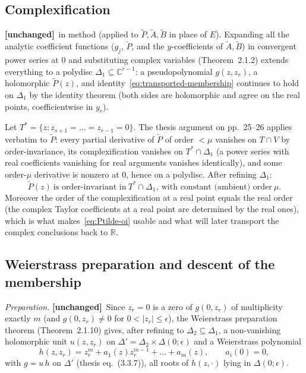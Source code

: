 \documentclass[11pt,a4paper]{article}
\theoremstyle{plain}
\theoremstyle{definition}
\newcommand{\R}{\mathbb{R}}
\newcommand{\C}{\mathbb{C}}
\newcommand{\UNCHANGED}{\textbf{[unchanged]}}
\begin{document}
\subsection{Complexification}\label{ssec:complexify}

\UNCHANGED\ in method (applied to $\widetilde P,\widetilde A,\widetilde B$ in
place of $E$). Expanding all the analytic coefficient functions
($g_j$, $\widetilde P$, and the $y$-coefficients of $\widetilde A,\widetilde
B$) in convergent power series at $0$ and substituting complex variables
(Theorem~2.1.2) extends everything to a polydisc
$\Delta_1\subseteq\C^{r-1}$: a pseudopolynomial $g(z,z_r)$, a holomorphic
$\widetilde P(z)$, and identity~\eqref{eq:transported-membership} continues to
hold on $\Delta_1$ by the identity theorem (both sides are holomorphic and
agree on the real points, coefficientwise in $y_r$).

Let $T^*=\{z:z_{s+1}=\dots=z_{r-1}=0\}$. The thesis argument on pp.~25--26
applies verbatim to $\widetilde P$: every partial derivative of
$\widetilde P$ of order $<\mu$ vanishes on $T\cap V$ by order-invariance, its
complexification vanishes on $T^*\cap\Delta_1$ (a power series with real
coefficients vanishing for real arguments vanishes identically), and some
order-$\mu$ derivative is nonzero at $0$, hence on a polydisc. After
refining $\Delta_1$:
\begin{equation}\label{eq:Ptilde-oi}
  \widetilde P(z)\ \text{is order-invariant in}\ T^*\cap\Delta_1,
  \ \text{with constant (ambient) order}\ \mu .
\end{equation}
Moreover the order of the complexification at a real point equals the real
order (the complex Taylor coefficients at a real point are determined by the
real ones), which is what makes~\eqref{eq:Ptilde-oi} usable and what will
later transport the complex conclusions back to $\R$.

\subsection{Weierstrass preparation and descent of the membership}
\label{ssec:prep}

\emph{Preparation.} \UNCHANGED\ Since $z_r=0$ is a zero of $g(0,z_r)$ of
multiplicity exactly $m$ (and $g(0,z_r)\neq0$ for $0<|z_r|\le\epsilon$), the
Weierstrass preparation theorem (Theorem~2.1.10) gives, after refining to
$\Delta_2\subseteq\Delta_1$, a non-vanishing holomorphic unit $u(z,z_r)$ on
$\Delta'=\Delta_2\times\Delta(0;\epsilon)$ and a Weierstrass polynomial
\[
  h(z,z_r)=z_r^{m}+a_1(z)z_r^{m-1}+\dots+a_m(z),\qquad a_i(0)=0,
\]
with $g=u\,h$ on $\Delta'$ (thesis eq.~(3.3.7)), all roots of $h(z,\cdot)$
lying in $\Delta(0;\epsilon)$.
\end{document}
